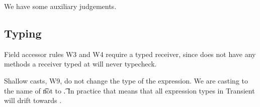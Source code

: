 \documentclass[a4paper,USenglish]{tex/lipics-v2016}
\begin{document}

\begin{mathpar}
\end{mathpar}

We have some auxiliary judgements.

\begin{mathpar}







\end{mathpar}



\subsection{Typing}

Field accessor rules W3 and W4 require a typed receiver, since \any does
not have any methods a receiver typed at \any will never typecheck.

Shallow casts, W9, do not change the type of the expression. We are casting
to the name of \t not to \t.  In practice that means that all expression
types in Transient will drift towards \any.

~\\
\end{document}
